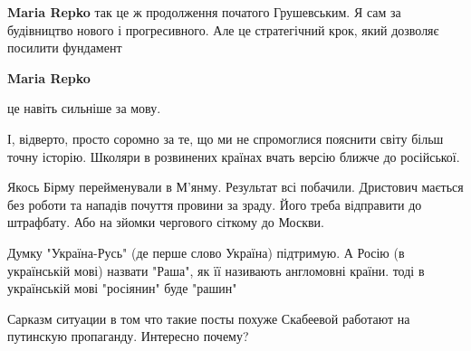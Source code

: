 \begin{itemize}
\begin{itemize}
\textbf{Maria Repko} так це ж продолження початого Грушевським.
Я сам за будівництво нового і прогресивного.
Але це стратегічний крок, який дозволяє посилити фундамент

 

\textbf{Maria Repko} 

це навіть сильніше за мову.

І, відверто, просто соромно за те, що ми не спромоглися пояснити світу більш
точну історію. Школяри в розвинених країнах вчать версію ближче до російської.


 


Якось Бірму перейменували в М'янму. Результат всі побачили. Дристович мається
без роботи та нападів почуття провини за зраду. Його треба відправити до
штрафбату. Або на зйомки чергового сіткому до Москви.
\end{itemize}

 

Думку "Україна-Русь" (де перше слово Україна) підтримую. А Росію (в українській
мові) назвати "Раша", як її називають англомовні країни. тоді в українській
мові "росіянин" буде "рашин"


 
Сарказм ситуации в том что такие посты похуже Скабеевой работают на путинскую пропаганду. Интересно почему?

 


\end{itemize}

